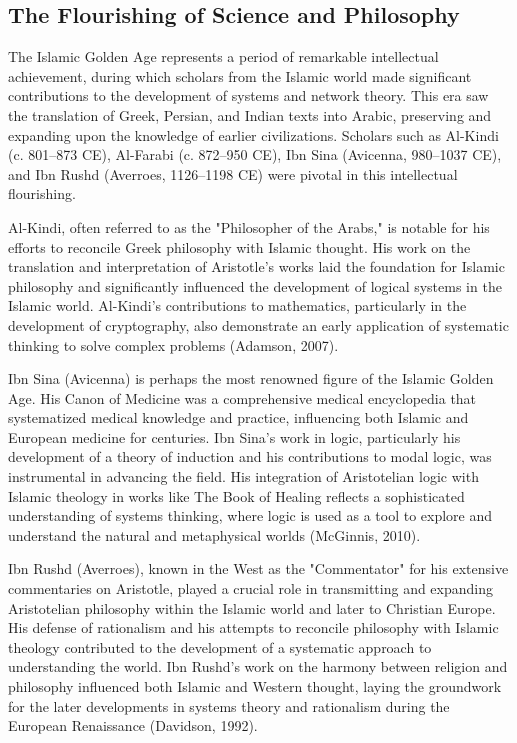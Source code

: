 \documentclass[twocolumn]{article}
\begin{document}
\subsection{The Flourishing of Science and Philosophy}

\textcolor{primary}{The Islamic Golden Age represents a period of remarkable intellectual achievement, during which scholars from the Islamic world made significant contributions to the development of systems and network theory. This era saw the translation of Greek, Persian, and Indian texts into Arabic, preserving and expanding upon the knowledge of earlier civilizations. Scholars such as Al-Kindi (c. 801–873 CE), Al-Farabi (c. 872–950 CE), Ibn Sina (Avicenna, 980–1037 CE), and Ibn Rushd (Averroes, 1126–1198 CE) were pivotal in this intellectual flourishing.}

\textcolor{secondary}{Al-Kindi, often referred to as the "Philosopher of the Arabs," is notable for his efforts to reconcile Greek philosophy with Islamic thought. His work on the translation and interpretation of Aristotle's works laid the foundation for Islamic philosophy and significantly influenced the development of logical systems in the Islamic world. Al-Kindi's contributions to mathematics, particularly in the development of cryptography, also demonstrate an early application of systematic thinking to solve complex problems (Adamson, 2007).}

\textcolor{primary}{Ibn Sina (Avicenna) is perhaps the most renowned figure of the Islamic Golden Age. His Canon of Medicine was a comprehensive medical encyclopedia that systematized medical knowledge and practice, influencing both Islamic and European medicine for centuries. Ibn Sina's work in logic, particularly his development of a theory of induction and his contributions to modal logic, was instrumental in advancing the field. His integration of Aristotelian logic with Islamic theology in works like The Book of Healing reflects a sophisticated understanding of systems thinking, where logic is used as a tool to explore and understand the natural and metaphysical worlds (McGinnis, 2010).}

\textcolor{secondary}{Ibn Rushd (Averroes), known in the West as the "Commentator" for his extensive commentaries on Aristotle, played a crucial role in transmitting and expanding Aristotelian philosophy within the Islamic world and later to Christian Europe. His defense of rationalism and his attempts to reconcile philosophy with Islamic theology contributed to the development of a systematic approach to understanding the world. Ibn Rushd's work on the harmony between religion and philosophy influenced both Islamic and Western thought, laying the groundwork for the later developments in systems theory and rationalism during the European Renaissance (Davidson, 1992).}
\end{document}
